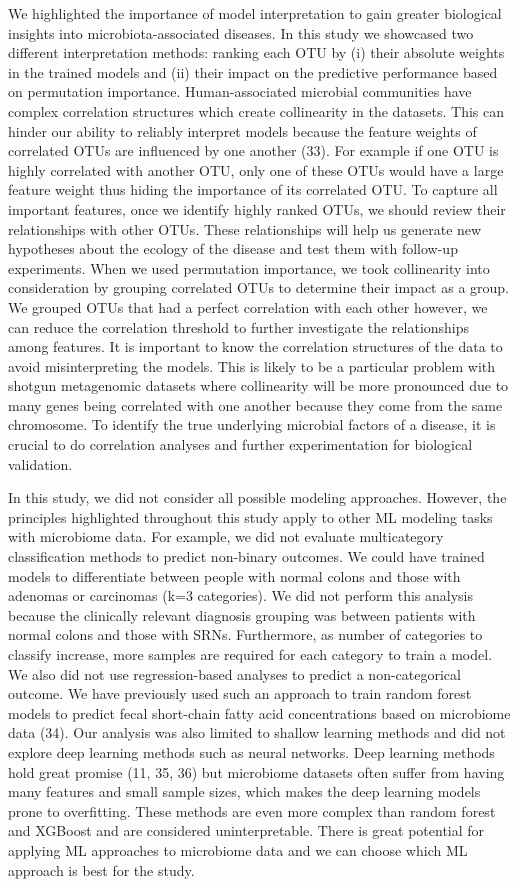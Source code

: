\documentclass[11pt,]{article}
\begin{document}
We highlighted the importance of model interpretation to gain greater
biological insights into microbiota-associated diseases. In this study
we showcased two different interpretation methods: ranking each OTU by
(i) their absolute weights in the trained models and (ii) their impact
on the predictive performance based on permutation importance.
Human-associated microbial communities have complex correlation
structures which create collinearity in the datasets. This can hinder
our ability to reliably interpret models because the feature weights of
correlated OTUs are influenced by one another (33). For example if one
OTU is highly correlated with another OTU, only one of these OTUs would
have a large feature weight thus hiding the importance of its correlated
OTU. To capture all important features, once we identify highly ranked
OTUs, we should review their relationships with other OTUs. These
relationships will help us generate new hypotheses about the ecology of
the disease and test them with follow-up experiments. When we used
permutation importance, we took collinearity into consideration by
grouping correlated OTUs to determine their impact as a group. We
grouped OTUs that had a perfect correlation with each other however, we
can reduce the correlation threshold to further investigate the
relationships among features. It is important to know the correlation
structures of the data to avoid misinterpreting the models. This is
likely to be a particular problem with shotgun metagenomic datasets
where collinearity will be more pronounced due to many genes being
correlated with one another because they come from the same chromosome.
To identify the true underlying microbial factors of a disease, it is
crucial to do correlation analyses and further experimentation for
biological validation.

In this study, we did not consider all possible modeling approaches.
However, the principles highlighted throughout this study apply to other
ML modeling tasks with microbiome data. For example, we did not evaluate
multicategory classification methods to predict non-binary outcomes. We
could have trained models to differentiate between people with normal
colons and those with adenomas or carcinomas (k=3 categories). We did
not perform this analysis because the clinically relevant diagnosis
grouping was between patients with normal colons and those with SRNs.
Furthermore, as number of categories to classify increase, more samples
are required for each category to train a model. We also did not use
regression-based analyses to predict a non-categorical outcome. We have
previously used such an approach to train random forest models to
predict fecal short-chain fatty acid concentrations based on microbiome
data (34). Our analysis was also limited to shallow learning methods and
did not explore deep learning methods such as neural networks. Deep
learning methods hold great promise (11, 35, 36) but microbiome datasets
often suffer from having many features and small sample sizes, which
makes the deep learning models prone to overfitting. These methods are
even more complex than random forest and XGBoost and are considered
uninterpretable. There is great potential for applying ML approaches to
microbiome data and we can choose which ML approach is best for the
study.
\end{document}

